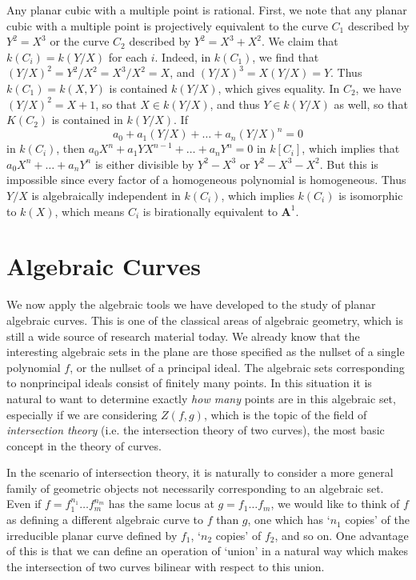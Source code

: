 \begin{example}
    Any planar cubic with a multiple point is rational. First, we note that any planar cubic with a multiple point is projectively equivalent to the curve $C_1$ described by $Y^2 = X^3$ or the curve $C_2$ described by $Y^2 = X^3 + X^2$. We claim that $k(C_i) = k(Y/X)$ for each $i$. Indeed, in $k(C_1)$, we find that $(Y/X)^2 = Y^2/X^2 = X^3/X^2 = X$, and $(Y/X)^3 = X(Y/X) = Y$. Thus $k(C_1) = k(X,Y)$ is contained $k(Y/X)$, which gives equality. In $C_2$, we have $(Y/X)^2 = X + 1$, so that $X \in k(Y/X)$, and thus $Y \in k(Y/X)$ as well, so that $K(C_2)$ is contained in $k(Y/X)$. If
    \[ a_0 + a_1(Y/X) + \dots + a_n (Y/X)^n = 0 \]
    in $k(C_i)$, then $a_0 X^n + a_1 YX^{n-1} + \dots + a_n Y^n = 0$ in $k[C_i]$, which implies that $a_0 X^n + \dots + a_n Y^n$ is either divisible by $Y^2 - X^3$ or $Y^2 - X^3 - X^2$. But this is impossible since every factor of a homogeneous polynomial is homogeneous. Thus $Y/X$ is algebraically independent in $k(C_i)$, which implies $k(C_i)$ is isomorphic to $k(X)$, which means $C_i$ is birationally equivalent to $\mathbf{A}^1$.
\end{example}










\chapter{Algebraic Curves}

We now apply the algebraic tools we have developed to the study of planar algebraic curves. This is one of the classical areas of algebraic geometry, which is still a wide source of research material today. We already know that the interesting algebraic sets in the plane are those specified as the nullset of a single polynomial $f$, or the nullset of a principal ideal. The algebraic sets corresponding to nonprincipal ideals consist of finitely many points. In this situation it is natural to want to determine exactly {\it how many} points are in this algebraic set, especially if we are considering $Z(f,g)$, which is the topic of the field of {\it intersection theory} (i.e. the intersection theory of two curves), the most basic concept in the theory of curves.

In the scenario of intersection theory, it is naturally to consider a more general family of geometric objects not necessarily corresponding to an algebraic set. Even if $f = f_1^{n_1} \dots f_m^{n_m}$ has the same locus at $g = f_1 \dots f_m$, we would like to think of $f$ as defining a different algebraic curve to $f$ than $g$, one which has `$n_1$ copies' of the irreducible planar curve defined by $f_1$, `$n_2$ copies' of $f_2$, and so on. One advantage of this is that we can define an operation of `union' in a natural way which makes the intersection of two curves bilinear with respect to this union.

